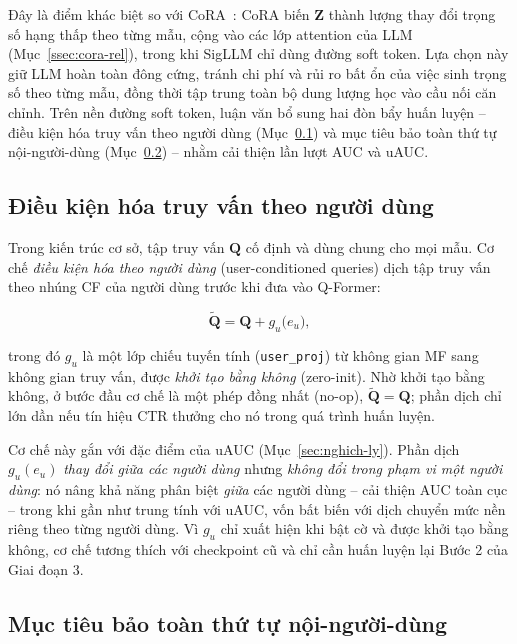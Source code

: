 Đây là điểm khác biệt so với CoRA~\cite{cora2024}: CoRA biến $\mathbf{Z}$ thành lượng thay
đổi trọng số hạng thấp theo từng mẫu, cộng vào các lớp attention của LLM
(Mục~\ref{ssec:cora-rel}), trong khi SigLLM chỉ dùng đường soft token. Lựa chọn này giữ
LLM hoàn toàn đông cứng, tránh chi phí và rủi ro bất ổn của việc sinh trọng số theo từng
mẫu, đồng thời tập trung toàn bộ dung lượng học vào cầu nối căn chỉnh. Trên nền đường soft
token, luận văn bổ sung hai đòn bẩy huấn luyện -- điều kiện hóa truy vấn theo người dùng
(Mục~\ref{ssec:user-conditioned}) và mục tiêu bảo toàn thứ tự nội-người-dùng
(Mục~\ref{ssec:align-rank}) -- nhằm cải thiện lần lượt AUC và uAUC.

\subsection{Điều kiện hóa truy vấn theo người dùng}
\label{ssec:user-conditioned}

Trong kiến trúc cơ sở, tập truy vấn $\mathbf{Q}$ cố định và dùng chung cho mọi mẫu. Cơ chế
\textit{điều kiện hóa theo người dùng} (user-conditioned queries) dịch tập truy vấn theo
nhúng CF của người dùng trước khi đưa vào Q-Former:

\begin{equation} \label{eq:user-cond}
\tilde{\mathbf{Q}} = \mathbf{Q} + g_u\big( e_u \big),
\end{equation}

trong đó $g_u$ là một lớp chiếu tuyến tính (\texttt{user\_proj}) từ không gian MF sang
không gian truy vấn, được \textit{khởi tạo bằng không} (zero-init). Nhờ khởi tạo bằng
không, ở bước đầu cơ chế là một phép đồng nhất (no-op), $\tilde{\mathbf{Q}} = \mathbf{Q}$;
phần dịch chỉ lớn dần nếu tín hiệu CTR thưởng cho nó trong quá trình huấn luyện.

Cơ chế này gắn với đặc điểm của uAUC (Mục~\ref{sec:nghich-ly}). Phần dịch $g_u(e_u)$
\textit{thay đổi giữa các người dùng} nhưng \textit{không đổi trong phạm vi một người
dùng}: nó nâng khả năng phân biệt \textit{giữa} các người dùng -- cải thiện AUC toàn cục --
trong khi gần như trung tính với uAUC, vốn bất biến với dịch chuyển mức nền riêng theo từng
người dùng. Vì $g_u$ chỉ xuất hiện khi bật cờ và được khởi tạo bằng không, cơ chế tương
thích với checkpoint cũ và chỉ cần huấn luyện lại Bước 2 của Giai đoạn 3.

\subsection{Mục tiêu bảo toàn thứ tự nội-người-dùng}
\label{ssec:align-rank}

